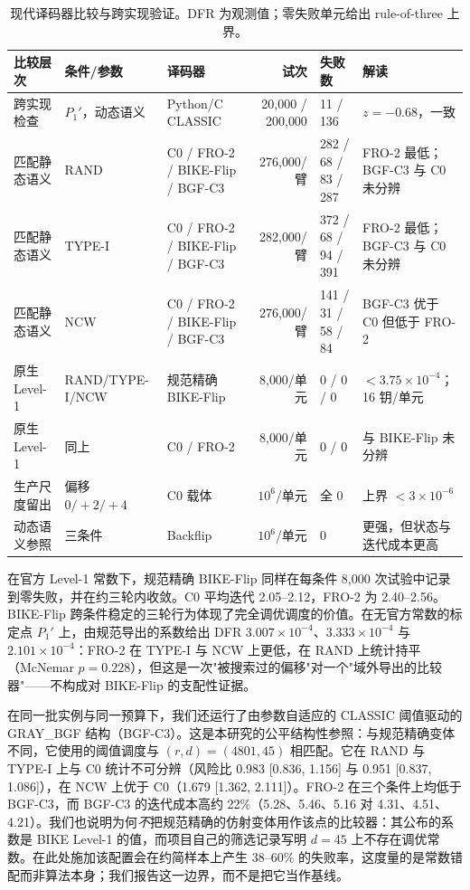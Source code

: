 \documentclass[UTF8,a4paper,10pt,twocolumn]{ctexart}
\begin{document}
\begin{table}[t]
\centering
\caption{现代译码器比较与跨实现验证。DFR 为观测值；零失败单元给出 rule-of-three 上界。}
\label{tab:modern}
\begin{tabular}{@{}p{2.5cm}p{2.4cm}p{2.6cm}rp{1.5cm}p{4.4cm}@{}}
\toprule
比较层次 & 条件/参数 & 译码器 & 试次 & 失败数 & 解读 \\
\midrule
跨实现检查 & $P_1'$，动态语义 & Python/C CLASSIC & 20{,}000 / 200{,}000 & 11 / 136 & $z=-0.68$，一致 \\
\midrule
匹配静态语义 & RAND & C0 / FRO-2 / BIKE-Flip / BGF-C3 & 276{,}000/臂 & 282 / 68 / 83 / 287 & FRO-2 最低；BGF-C3 与 C0 未分辨\\
匹配静态语义 & TYPE-I & C0 / FRO-2 / BIKE-Flip / BGF-C3 & 282{,}000/臂 & 372 / 68 / 94 / 391 & FRO-2 最低；BGF-C3 与 C0 未分辨\\
匹配静态语义 & NCW & C0 / FRO-2 / BIKE-Flip / BGF-C3 & 276{,}000/臂 & 141 / 31 / 58 / 84 & BGF-C3 优于 C0 但低于 FRO-2\\
\midrule
原生 Level-1 & RAND/TYPE-I/NCW & 规范精确 BIKE-Flip & 8{,}000/单元 & 0 / 0 / 0 & $<3.75\times10^{-4}$；16 钥/单元 \\
原生 Level-1 & 同上 & C0 / FRO-2 & 8{,}000/单元 & 0 / 0 & 与 BIKE-Flip 未分辨 \\
\midrule
生产尺度留出 & 偏移 $0/+2/+4$ & C0 载体 & $10^6$/单元 & 全 0 & 上界 $<3\times10^{-6}$ \\
动态语义参照 & 三条件 & Backflip & $10^6$/单元 & 0 & 更强，但状态与迭代成本更高 \\
\bottomrule
\end{tabular}
\end{table}

在官方 Level-1 常数下，规范精确 BIKE-Flip 同样在每条件 8{,}000 次试验中记录到零失败，并在约三轮内收敛。C0 平均迭代 2.05--2.12，FRO-2 为 2.40--2.56。BIKE-Flip 跨条件稳定的三轮行为体现了完全调优调度的价值。在无官方常数的标定点 $P_1'$ 上，由规范导出的系数给出 DFR $3.007\times10^{-4}$、$3.333\times10^{-4}$ 与 $2.101\times10^{-4}$：FRO-2 在 TYPE-I 与 NCW 上更低，在 RAND 上统计持平（McNemar $p=0.228$），但这是一次"被搜索过的偏移"对一个"域外导出的比较器"——不构成对 BIKE-Flip 的支配性证据。

在同一批实例与同一预算下，我们还运行了由参数自适应的 CLASSIC 阈值驱动的 GRAY\_BGF 结构（BGF-C3）。这是本研究的公平结构性参照：与规范精确变体不同，它使用的阈值调度与 $(r,d)=(4801,45)$ 相匹配。它在 RAND 与 TYPE-I 上与 C0 统计不可分辨（风险比 0.983 [0.836, 1.156] 与 0.951 [0.837, 1.086]），在 NCW 上优于 C0（1.679 [1.362, 2.111]）。FRO-2 在三个条件上均低于 BGF-C3，而 BGF-C3 的迭代成本高约 22\%（5.28、5.46、5.16 对 4.31、4.51、4.21）。我们也说明为何\emph{不}把规范精确的仿射变体用作该点的比较器：其公布的系数是 BIKE Level-1 的值，而项目自己的筛选记录写明 $d=45$ 上不存在调优常数。在此处施加该配置会在约简样本上产生 38--60\% 的失败率，这度量的是常数错配而非算法本身；我们报告这一边界，而不是把它当作基线。
\end{document}
